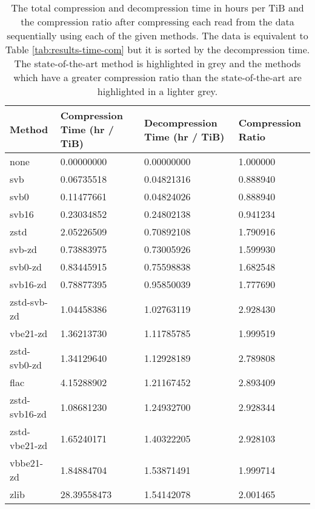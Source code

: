 \begin{table}
    \caption{\label{tab:results-time-dec} The total compression and
	decompression time in hours per TiB and the compression ratio after
	compressing each read from the data sequentially using each of the given
	methods. The data is equivalent to Table \ref{tab:results-time-com} but
	it is sorted by the decompression time. The state-of-the-art method is
	highlighted in grey and the methods which have a greater compression
	ratio than the state-of-the-art are highlighted in a lighter grey.}
	\begin{tabular}{|l|l|l|l|}
	    \hline
	    Method & Compression Time (hr / TiB) & Decompression Time (hr / TiB) & Compression Ratio \\
\hline
		none    & 0.00000000      & 0.00000000    &1.000000\\
                svb     & 0.06735518      & 0.04821316    &0.888940\\
               svb0     & 0.11477661      & 0.04824026    &0.888940\\
              svb16     & 0.23034852      & 0.24802138    &0.941234\\
               zstd     & 2.05226509      & 0.70892108    &1.790916\\
             svb-zd     & 0.73883975      & 0.73005926    &1.599930\\
            svb0-zd     & 0.83445915      & 0.75598838    &1.682548\\
           svb16-zd     & 0.78877395      & 0.95850039    &1.777690\\
		\rowcolor{gray}
        zstd-svb-zd     & 1.04458386      & 1.02763119    &2.928430\\
           vbe21-zd     & 1.36213730      & 1.11785785    &1.999519\\
       zstd-svb0-zd     & 1.34129640      & 1.12928189    &2.789808\\
               flac     & 4.15288902      & 1.21167452    &2.893409\\
      zstd-svb16-zd     & 1.08681230      & 1.24932700    &2.928344\\
      zstd-vbe21-zd     & 1.65240171      & 1.40322205    &2.928103\\
          vbbe21-zd     & 1.84884704      & 1.53871491    &1.999714\\
               zlib     &28.39558473      & 1.54142078    &2.001465\\

\end{tabular}
\end{table}
